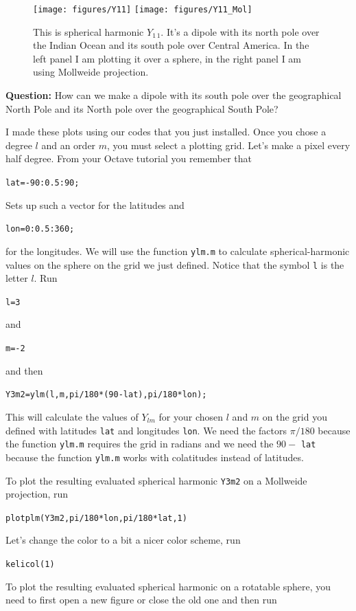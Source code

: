 \documentclass[11pt]{article}
\newcommand{\Yfun}{Y}
\begin{document}
\begin{figure}[ht!]
  \centering \texttt{[image: figures/Y11]} \texttt{[image: figures/Y11\_Mol]}
  \caption{This is spherical harmonic $\Yfun_{1\,1}$. It's a dipole with
    its north pole over the Indian Ocean and its south pole over Central
    America. In the left panel I am plotting it over a sphere, in the
    right panel I am using Mollweide projection.}
  \label{Y11fig}
\end{figure}

\textbf{Question:} How can we make a dipole with its south pole over
the geographical North Pole and its North pole over the geographical
South Pole?


I made these plots using our codes that you just installed. Once you
chose a degree $l$ and an order $m$, you must select a plotting
grid. Let's make a pixel every half degree. From your Octave tutorial
you remember that

\qquad \verb+lat=-90:0.5:90;+

Sets up such a vector for the latitudes and 

\qquad \verb+lon=0:0.5:360;+

for the longitudes. We will use the function \verb+ylm.m+ to
calculate spherical-harmonic values on the sphere on the grid we just
defined. Notice that the symbol \verb+l+ is the letter $l$. Run

\qquad \verb+l=3+ 

and 

\qquad \verb+m=-2+

and then 

\qquad \verb+Y3m2=ylm(l,m,pi/180*(90-lat),pi/180*lon);+

This will calculate the values of $\Yfun_{lm}$ for your chosen $l$ and
$m$ on the grid you defined with latitudes \verb+lat+ and longitudes
\verb+lon+. We need the factors $\pi/180$ because the function
\verb+ylm.m+ requires the grid in radians and we need the $90-$
\verb+lat+ because the function \verb+ylm.m+ works with colatitudes
instead of latitudes.

To plot the resulting evaluated spherical harmonic \verb+Y3m2+ on a
Mollweide projection, run
  
\qquad \verb+plotplm(Y3m2,pi/180*lon,pi/180*lat,1)+

Let's change the color to a bit a nicer color scheme, run

\quad \verb+kelicol(1)+


To plot the resulting evaluated spherical harmonic on a rotatable
sphere, you need to first open a new figure or close the old one and
then run
\end{document}
